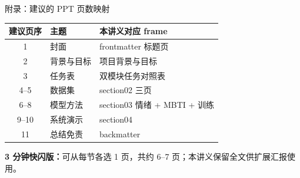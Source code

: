 \begin{frame}{附录：建议的 PPT 页数映射}
    \footnotesize
    \begin{table}
        \centering
        \begin{tabular}{clp{7cm}}
            \toprule
            建议页序 & 主题 & 本讲义对应 frame \\
            \midrule
            1 & 封面 & frontmatter 标题页 \\
            2 & 背景与目标 & 项目背景与目标 \\
            3 & 任务表 & 双模块任务对照表 \\
            4--5 & 数据集 & section02 三页 \\
            6--8 & 模型方法 & section03 情绪 + MBTI + 训练 \\
            9--10 & 系统演示 & section04 \\
            11 & 总结免责 & backmatter \\
            \bottomrule
        \end{tabular}
    \end{table}

    \vspace{0.5em}
    \textbf{3 分钟快闪版：}可从每节各选 1 页，共约 6--7 页；本讲义保留全文供扩展汇报使用。
\end{frame}
